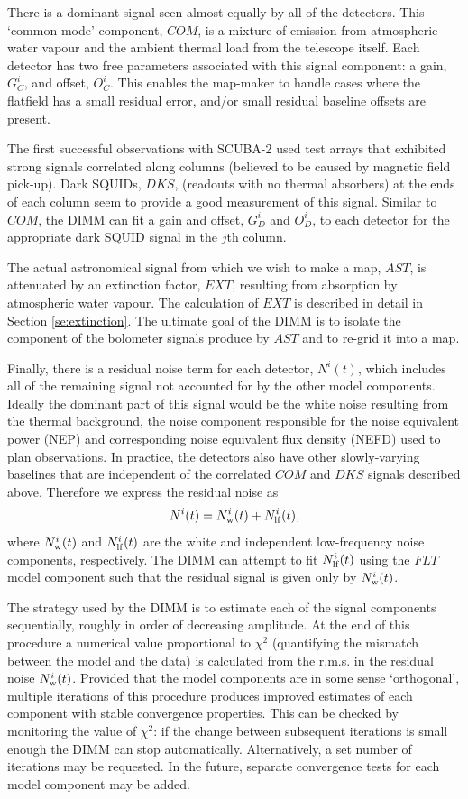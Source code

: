 \documentclass[twoside,11pt]{article}
\renewcommand{\_}{\texttt{\symbol{95}}}
\begin{document}
There is a dominant signal seen almost equally by all of the
detectors. This `common-mode' component, $COM$, is a mixture of
emission from atmospheric water vapour and the ambient thermal load
from the telescope itself. Each detector has two free parameters
associated with this signal component: a gain, $G_C^i$, and offset,
$O_C^i$. This enables the map-maker to handle cases where the
flatfield has a small residual error, and/or small residual baseline
offsets are present.

The first successful observations with SCUBA-2 used test arrays that
exhibited strong signals correlated along columns (believed to be
caused by magnetic field pick-up). Dark SQUIDs, $DKS$, (readouts with
no thermal absorbers) at the ends of
each
column seem to provide
a good measurement of this signal. Similar to $COM$, the DIMM can fit
a gain and offset, $G_D^i$ and $O_D^i$, to each detector for the
appropriate dark SQUID signal in the $j$th column.

The actual astronomical signal from which we wish to make a map,
$AST$, is attenuated by an extinction factor, $EXT$, resulting from
absorption by atmospheric water vapour. The calculation of $EXT$ is
described in detail in Section \ref{se:extinction}. The ultimate goal
of the DIMM is to isolate the component of the bolometer signals
produce by $AST$ and to re-grid it into a map.

Finally, there is a residual noise term for each detector, $N^i(t)$,
which includes all of the remaining signal not accounted for by the
other model components. Ideally the dominant part of this signal would
be the white noise resulting from the thermal background, the noise
component responsible for the noise equivalent power (NEP) and
corresponding noise equivalent flux density (NEFD) used to plan
observations. In practice, the detectors also have other
slowly-varying baselines that are independent of the correlated $COM$
and $DKS$ signals described above. Therefore we express the residual
noise as
%
\begin{equation}
N^i(t) = N^i_{\rm w}(t) + N^i_{\rm lf}(t),
\label{eq:dimm_noise}
\end{equation}
%
where $N^i_{\rm w}(t)$ and $N^i_{\rm lf}(t)$ are the white and
independent low-frequency noise components, respectively. The DIMM can
attempt to fit $N^i_{\rm lf}(t)$ using the $FLT$ model component such
that the residual signal is given only by $N^i_{\rm w}(t)$.

The strategy used by the DIMM is to estimate each of the signal
components sequentially, roughly in order of decreasing amplitude. At
the end of this procedure a numerical value proportional to $\chi^2$
(quantifying the mismatch between the model and the data) is
calculated from the r.m.s. in the residual noise $N^i_{\rm
  w}(t)$. Provided that the model components are in some sense
`orthogonal', multiple iterations of this procedure produces improved
estimates of each component with stable convergence properties. This
can be checked by monitoring the value of $\chi^2$: if the change
between subsequent iterations is small enough the DIMM can stop
automatically. Alternatively, a set number of iterations may be
requested. In the future, separate convergence tests for each model
component may be added.
\end{document}
